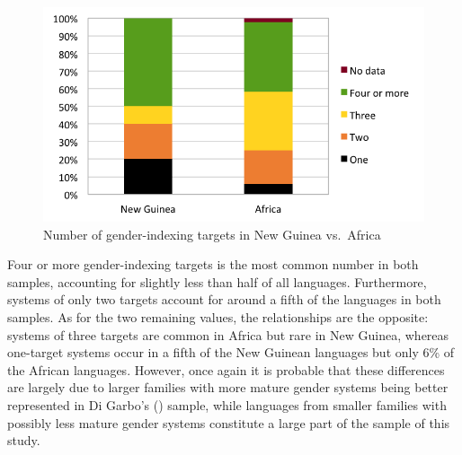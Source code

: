 \documentclass[output=collectionpaper]{langsci/langscibook}
\begin{document}
\begin{figure}
\caption{Number of gender-indexing targets in New Guinea vs.\ Africa}
\label{fig:Svard:10}
\includegraphics[width=.8\textwidth]{figures/09/fig10.png}


\end{figure}

Four or more gender-indexing targets is the most common number in both samples, accounting for slightly less than half of all languages. Furthermore, systems of only two targets account for around a fifth of the languages in both samples. As for the two remaining values, the relationships are the opposite: systems of three targets are common in Africa but rare in New Guinea, whereas one-target systems occur in a fifth of the New Guinean languages but only 6\% of the African languages. However, once again it is probable that these differences are largely due to larger families with more mature gender systems being better represented in Di Garbo's (\citeyear{DiGarbo2014}) sample, while languages from smaller families with possibly less mature gender systems constitute a large part of the sample of this study.
\end{document}
